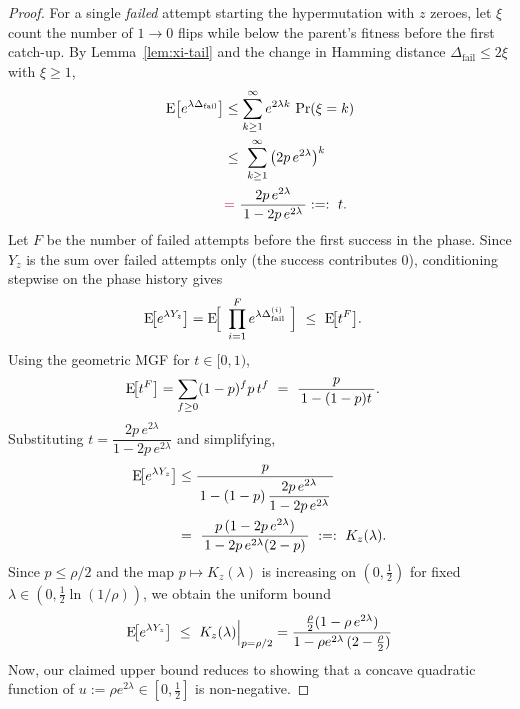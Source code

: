 \begin{proof}
	For a single \emph{failed} attempt starting the hypermutation with $z$ zeroes, let $\xi$ count the number of $1\!\to 0$ flips while below the parent's fitness before the first catch-up.
	By Lemma~\ref{lem:xi-tail} and the change in Hamming distance $\Delta_{\mathrm{fail}}\le 2\xi$ with $\xi\ge 1$,
	\begin{align*}
		\EE\!\left[e^{\lambda \Delta_{\mathrm{fail}}}\right]
		&\le \sum_{k\ge 1}^{\infty} e^{2\lambda k}\,\Pr(\xi=k)
		\\ &\le\ \sum_{k\ge 1}^{\infty} \big(2p\,e^{2\lambda}\big)^{k}
		\\ &\textcolor{purple}{=}\ \frac{2p\,e^{2\lambda}}{\,1-2p\,e^{2\lambda}\,}:=:\ t.
	\end{align*}
	Let $F$ be the number of failed attempts before the first success in the phase. %
	Since $Y_z$ is the sum over failed attempts only (the success contributes $0$), conditioning stepwise on the phase history gives
	\begin{align*}
		\text{E}\!\big[e^{\lambda Y_z}\big]
		&=\text{E}\!\Big[\ \prod_{i=1}^{F} e^{\lambda \Delta_{\mathrm{fail}}^{(i)}}\ \Big]
		\ \le\ \text{E}\!\big[t^{F}\big].
	\end{align*}
	Using the geometric MGF for $t\in[0,1)$,
	\begin{align*}
		\text{E}\!\big[t^{F}\big]
		&=
		 \sum_{f\ge 0} (1-p)^f p\, t^f
		\ =\ \frac{p}{\,1-(1-p)t\,}.
	\end{align*}
	Substituting $t=\dfrac{2p\,e^{2\lambda}}{1-2p\,e^{2\lambda}}$ and simplifying,
	\begin{align*}
		\EE\!\big[e^{\lambda Y_z}\big]
		&\le \frac{p}{\,1-(1-p)\,\dfrac{2p\,e^{2\lambda}}{1-2p\,e^{2\lambda}}\,}
		\\ &=\ \frac{p\,(1-2p\,e^{2\lambda})}{\,1-2p\,e^{2\lambda}(2-p)\,}
		\ :=:\ K_z(\lambda).
	\end{align*}
	Since $p\le \rho/2$ and the map $p\mapsto K_z(\lambda)$ is increasing on $(0,\tfrac12)$ for fixed $\lambda\in(0,\tfrac12\ln(1/\rho))$, we obtain the uniform bound
	\begin{align*}
		\EE\!\big[e^{\lambda Y_z}\big]
		\ \le\ K_z(\lambda)\Big|_{p=\rho/2}=\frac{\tfrac{\rho}{2}(1-\rho\,e^{2\lambda})}{1-\rho e^{2\lambda}\,(2-\tfrac{\rho}{2})}
	\end{align*}
	Now, our claimed upper bound reduces to showing that a concave quadratic function of $u:=\rho e^{2\lambda} \in \left[0,\frac{1}{2}\right]$ is non-negative.

\end{proof}
